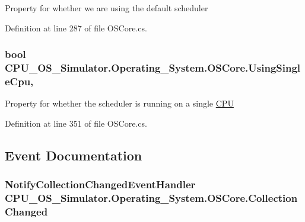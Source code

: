 Property for whether we are using the default scheduler 



Definition at line 287 of file O\+S\+Core.\+cs.

\hypertarget{class_c_p_u___o_s___simulator_1_1_operating___system_1_1_o_s_core_ac965e1317dc5c6b6ae93c410098dd913}{}
\subsubsection[{Using\+Single\+Cpu}]{\setlength{\rightskip}{0pt plus 5cm}bool C\+P\+U\+\_\+\+O\+S\+\_\+\+Simulator.\+Operating\+\_\+\+System.\+O\+S\+Core.\+Using\+Single\+Cpu\hspace{0.3cm}{\ttfamily [get]}, {\ttfamily [set]}}\label{class_c_p_u___o_s___simulator_1_1_operating___system_1_1_o_s_core_ac965e1317dc5c6b6ae93c410098dd913}


Property for whether the scheduler is running on a single \hyperlink{namespace_c_p_u___o_s___simulator_1_1_c_p_u}{C\+P\+U} 



Definition at line 351 of file O\+S\+Core.\+cs.



\subsection{Event Documentation}
\hypertarget{class_c_p_u___o_s___simulator_1_1_operating___system_1_1_o_s_core_abcbb2efff8a4078fae3edb9b31f62198}{}
\subsubsection[{Collection\+Changed}]{\setlength{\rightskip}{0pt plus 5cm}Notify\+Collection\+Changed\+Event\+Handler C\+P\+U\+\_\+\+O\+S\+\_\+\+Simulator.\+Operating\+\_\+\+System.\+O\+S\+Core.\+Collection\+Changed}\label{class_c_p_u___o_s___simulator_1_1_operating___system_1_1_o_s_core_abcbb2efff8a4078fae3edb9b31f62198}


